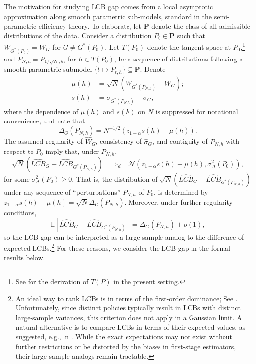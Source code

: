\documentclass[12pt]{article}
\numberwithin{equation}{section}
\theoremstyle{plain}                         %
\theoremstyle{definition}                  %
\theoremstyle{remark}                      %
\newcommand{\E}{\mathbb{E}}
\begin{document}
The motivation for studying LCB gap comes from a local asymptotic approximation along smooth parametric sub-models, standard in the semi-parametric efficiency theory. To elaborate, let $\mathbf{P}$ denote the class of all admissible distributions of the data. Consider a distribution $P_0 \in \mathbf{P}$ such that $W_{G^*(P_0)} = W_{G}$ for $G \ne G^*(P_0)$. Let $T(P_0)$ denote the tangent space at $P_0$,\footnote{See \citet{Hahn98} for the derivation of $T(P)$ in the present setting.} and $P_{N, h} = P_{1/\sqrt{N}, h}$, for $h \in T(P_0)$, be a sequence of distributions following a smooth parametric submodel $\{t \mapsto P_{t, h}\} \subseteq \mathbf{P}$. Denote
\[
\begin{array}{cl}
\mu(h) &= \sqrt{N}(W_{G^*(P_{N, h})} - W_{G});\\[3mm]
s(h) &= \sigma_{G^*(P_{N, h})} - \sigma_{G},
\end{array}
\] 
where the dependence of $\mu(h)$ and $s(h)$ on $N$ is suppressed for notational convenience, and note that
\[
\Delta_{G}(P_{N, h}) = N^{-1/2}(z_{1-\alpha} s(h) - \mu(h)).
\]
The assumed regularity of $\widehat{W}_{G}$, consistency of $\widehat{\sigma}_{G}$, and contiguity of $P_{N, h}$ with respect to $P_0$ imply that, under $P_{N, h}$,
\[
\sqrt{N}(\widehat{LCB}_{G} - \widehat{LCB}_{G^*(P_{N, h})}) \;\;\; \Rightarrow_d \;\;\; \mathcal{N}(z_{1-\alpha} s(h) - \mu(h), \sigma_{\Delta}^2(P_0)), 
\]
 for some $\sigma_{\Delta}^2(P_0) \geqslant 0$. That is, the distribution of $\sqrt{N}(\widehat{LCB}_{G} - \widehat{LCB}_{G^*(P_{N, h})})$ under any sequence of ``perturbations'' $P_{N, h}$ of $P_0$, is determined by $z_{1-\alpha}s(h) - \mu(h) = \sqrt{N} \Delta_{G}(P_{N, h})$. Moreover, under further regularity conditions, 
\[
\E[\widehat{LCB}_{G} - \widehat{LCB}_{G^*(P_{N, h})}] = \Delta_{G}(P_{N, h}) + o(1),
\]
so the LCB gap can be interpreted as a large-sample analog to the difference of expected LCBs.\footnote{An ideal way to rank LCBs is in terms of the first-order dominance; See \citet{Lehmann1959}. Unfortunately, since distinct policies typically result in LCBs with distinct large-sample variances, this criterion does not apply in a Gaussian limit. A natural alternative is to compare LCBs in terms of their expected values, as suggested, e.g.,  in \citet{LeonHarter}. While the exact expectations may not exist without further restrictions or be distorted by the biases in first-stage estimators, their large sample analogs remain tractable.} For these reasons, we consider the LCB gap in the formal results below.
\end{document}
